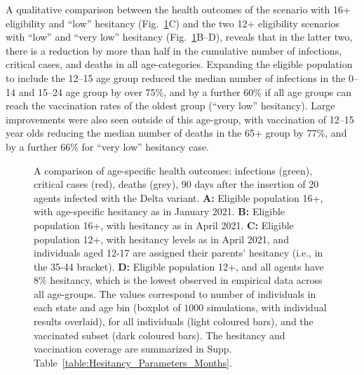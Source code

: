 \documentclass[article, a4, authoryear]{elsarticle}
\begin{document}
A qualitative comparison between the health outcomes of the scenario with 16+ eligibility and ``low'' hesitancy (Fig.~\ref{fig:AgeSpec_Hes_Outcomes_delta}C) and the two 12+ eligibility scenarios with ``low'' and ``very low'' hesitancy (Fig.~\ref{fig:AgeSpec_Hes_Outcomes_delta}B--D), reveals that in the latter two, there is a reduction by more than half in the cumulative number of infections, critical cases, and deaths in all age-categories. Expanding the eligible population to include the 12--15 age group reduced the median number of infections in the 0--14 and 15--24 age group by over 75\%, and by a further 60\% if all age groups can reach the vaccination rates of the oldest group (``very low'' hesitancy). Large improvements were also seen outside of this age-group, with vaccination of 12--15 year olds reducing the median number of deaths in the 65+ group by 77\%, and by a further 66\% for ``very low'' hesitancy case.

\begin{figure}[]
    \centering
    \hfill
    \hfill
     \hfill
    \caption{A comparison of age-specific health outcomes: infections (green), critical cases (red), deaths (grey), 90 days after the insertion of 20 agents infected with the Delta variant. \textbf{A:} Eligible population 16+, with age-specific hesitancy as in January 2021. \textbf{B:} Eligible population 16+, with hesitancy as in April 2021. \textbf{C:} Eligible population 12+, with hesitancy levels as in April 2021, and individuals aged 12-17 are assigned their parents' hesitancy (i.e., in the 35-44 bracket).  \textbf{D:} Eligible population 12+, and all agents have 8\% hesitancy, which is the lowest observed in empirical data across all age-groups. The values correspond to number of individuals in each state and age bin (boxplot of $1000$ simulations, with individual results overlaid), for all individuals (light coloured bars), and the vaccinated subset (dark coloured bars). The hesitancy and vaccination coverage are summarized in Supp. Table~\ref{table:Hesitancy_Parameters_Months}.}
    \label{fig:AgeSpec_Hes_Outcomes_delta}
\end{figure}
\end{document}
